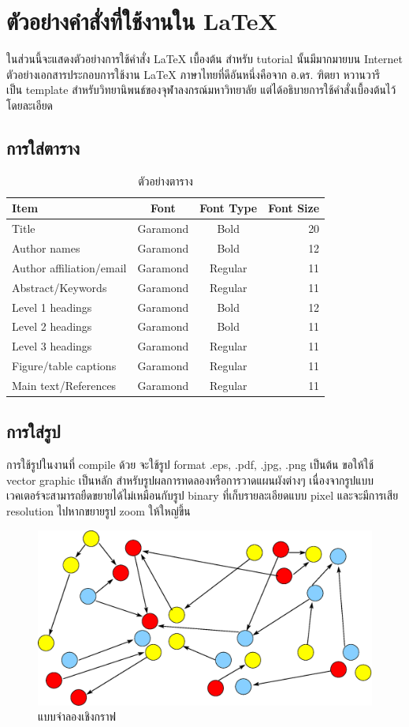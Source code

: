 \documentclass[11pt,a4paper]{article}
\begin{document}
\section{ตัวอย่างคำสั่งที่ใช้งานใน LaTeX}
ในส่วนนี้จะแสดงตัวอย่างการใช้คำสั่ง LaTeX เบื้องต้น สำหรับ tutorial นั้นมีมากมายบน Internet ตัวอย่างเอกสารประกอบการใช้งาน LaTeX ภาษาไทยที่ดีอันหนึ่งคือจาก อ.ดร. ฑิตยา หวานวารี~\cite{cuthesis} เป็น template สำหรับวิทยานิพนธ์ของจุฬาลงกรณ์มหาวิทยาลัย แต่ได้อธิบายการใช้คำสั่งเบื้องต้นไว้โดยละเอียด

\subsection{การใส่ตาราง}
\begin{table}[ht]
\centering
\caption{ตัวอย่างตาราง} 
\vspace{3mm}
\begin{tabular}{|l|c|c|r|} \hline
Item & Font & Font Type & Font Size \\ \hline
Title & Garamond & Bold & 20 \\
Author names & Garamond & Bold & 12 \\ 
Author affiliation/email & Garamond & Regular & 11 \\
Abstract/Keywords & Garamond & Regular & 11 \\
Level 1 headings & Garamond & Bold & 12 \\
Level 2 headings & Garamond & Bold & 11 \\
Level 3 headings & Garamond & Regular & 11 \\
Figure/table captions & Garamond & Regular & 11 \\
Main text/References & Garamond & Regular & 11 \\ \hline
\end{tabular}
\end{table}

\subsection{การใส่รูป}
การใช้รูปในงานที่ compile ด้วย \XeLaTeX จะใช้รูป format .eps, .pdf, .jpg, .png เป็นต้น ขอให้ใช้ vector graphic เป็นหลัก สำหรับรูปผลการทดลองหรือการวาดแผนผังต่างๆ เนื่องจากรูปแบบเวคเตอร์จะสามารถยืดขยายได้ไม่เหมือนกับรูป binary ที่เก็บรายละเอียดแบบ pixel และจะมีการเสีย resolution ไปหากขยายรูป zoom ให้ใหญ่ขึ้น
\begin{figure}[ht]
	\begin{center}
		\includegraphics[width=0.7\linewidth]{gm.eps}
		\caption{แบบจำลองเชิงกราฟ}
	\end{center}
\end{figure}
\end{document}
